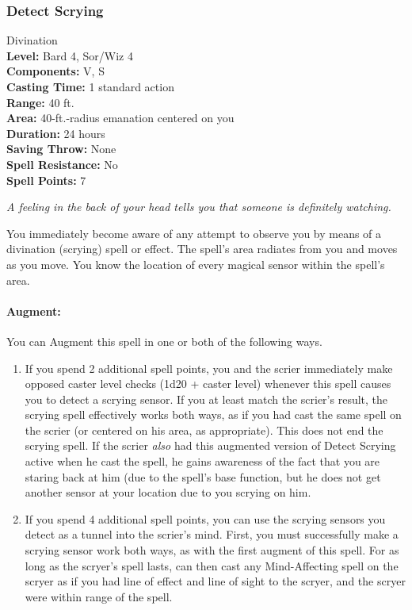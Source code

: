 \subsubsection{Detect Scrying}
\label{Spell:DetectScrying}
Divination
\\ \textbf{Level:} Bard 4, Sor/Wiz 4
\\ \textbf{Components:} V, S
\\ \textbf{Casting Time:} 1 standard action
\\ \textbf{Range:} 40 ft.
\\ \textbf{Area:} 40-ft.-radius emanation centered on you
\\ \textbf{Duration:} 24 hours
\\ \textbf{Saving Throw:} None
\\ \textbf{Spell Resistance:} No
\\ \textbf{Spell Points:} 7

\emph{A feeling in the back of your head tells you that someone is definitely watching.}

You immediately become aware of any attempt to observe you by means of a divination (scrying) spell or effect. 
The spell's area radiates from you and moves as you move. 
You know the location of every magical sensor within the spell's area.

\paragraph{Augment:} You can Augment this spell in one or both of the following ways.
\begin{enumerate}
 \item If you spend 2 additional spell points, 
you and the scrier immediately make opposed caster level checks (1d20 + caster level) whenever
this spell causes you to detect a scrying sensor. 
If you at least match the scrier's result, the scrying spell effectively works both ways,
as if you had cast the same spell on the scrier (or centered on his area, as appropriate).
This does not end the scrying spell. If the scrier \emph{also} had this augmented version of
Detect Scrying active when he cast the spell, he gains awareness of the fact that you are staring
back at him (due to the spell's base function, 
but he does not get another sensor at your location due to you scrying on him.
 \item If you spend 4 additional spell points, you can use the scrying sensors you detect as a tunnel into
the scrier's mind.
First, you must successfully make a scrying sensor work both ways, as with the first augment of this spell. 
For as long as the scryer's spell lasts, 
can then cast any Mind-Affecting spell on the scryer as if you had line of effect and line of sight to
the scryer, and the scryer were within range of the spell.
\end{enumerate}

